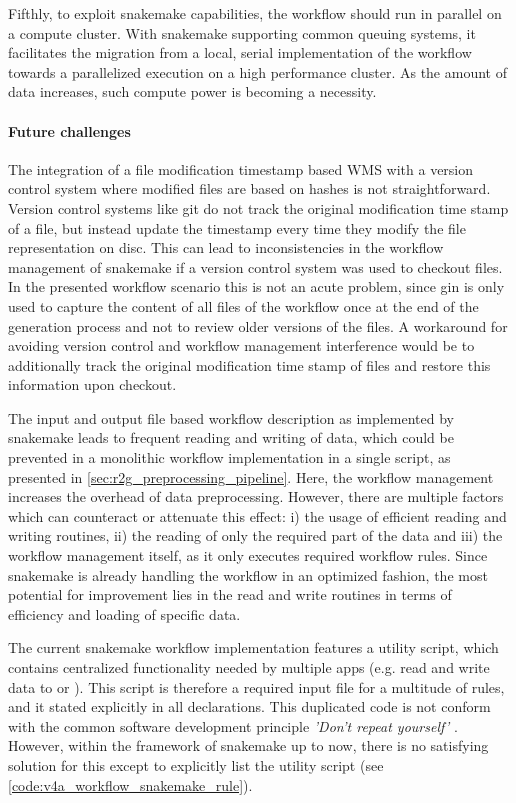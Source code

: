 Fifthly, to exploit snakemake capabilities, the workflow should run in parallel on a compute cluster. With snakemake supporting common queuing systems, it facilitates the migration from a local, serial implementation of the workflow towards a parallelized execution on a high performance cluster. As the amount of data increases, such compute power is becoming a necessity.

\paragraph{Future challenges}
The integration of a file modification timestamp based WMS with a version control system where modified files are based on hashes is not straightforward. Version control systems like git do not track the original modification time stamp of a file, but instead update the timestamp every time they modify the file representation on disc. This can lead to inconsistencies in the workflow management of snakemake if a version control system was used to checkout files. In the presented workflow scenario this is not an acute problem, since gin is only used to capture the content of all files of the workflow once at the end of the generation process and not to review older versions of the files. A workaround for avoiding version control and workflow management interference would be to additionally track the original modification time stamp of files and restore this information upon checkout.

The input and output file based workflow description as implemented by snakemake leads to frequent reading and writing of data, which could be prevented in a monolithic workflow implementation in a single script, as presented in \cref{sec:r2g_preprocessing_pipeline}. Here, the workflow management increases the overhead of data preprocessing. However, there are multiple factors which can counteract or attenuate this effect: i) the usage of efficient reading and writing routines, ii) the reading of only the required part of the data and iii) the workflow management itself, as it only executes required workflow rules. Since snakemake is already handling the workflow in an optimized fashion, the most potential for improvement lies in the read and write routines in terms of efficiency and loading of specific data. 

The current snakemake workflow implementation features a utility script, which contains centralized functionality needed by multiple apps (e.g. read and write data to  or ). This script is therefore a required input file for a multitude of rules, and it stated explicitly in all  declarations. This duplicated code is not conform with the common software development principle \textit{'Don't repeat yourself'} \citep{Martin_2008}. However, within the framework of snakemake up to now, there is no satisfying solution for this except to explicitly list the utility script (see \cref{code:v4a_workflow_snakemake_rule}). 

